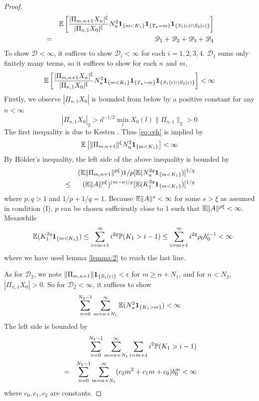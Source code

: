 \begin{proof}
\begin{eqnarray*}
    &&
    \E \left[
            {
        |\Pi_{m, n+1} X_n |^{\xi}
        \over
        |\Pi_{n, 1} X_0 |^{\xi}        
      }
      N_u^2
      \1{m < K_1} \1{T_u = m} \1{S_1(\epsilon) \cap S_2(\epsilon)} 
      \right] \nonumber \\
    &=& \mathscr D_1 + \mathscr D_2 + \mathscr D_3 + \mathscr D_4
  \end{eqnarray*}
  To show $\mathscr D < \infty$, it suffices to show
  $\mathscr D_i < \infty$ for each $i = 1, 2, 3, 4$.
  $\mathscr D_1$ sums only finitely many terms, so it
  suffices to show for each $n$ and $m$,
  \begin{equation}
    \label{eq:ceh}
    \E \left[
      {
        |\Pi_{m, n+1} X_n |^{\xi}
        \over
        |\Pi_{n, 1} X_0 |^{\xi}        
      }
      N_u^2
      \1{m < K_1} \1{T_u = m} \1{S_1(\epsilon) \cap S_2(\epsilon)} 
      \right] < \infty
  \end{equation}
  Firstly, we observe $|\Pi_{n, 1} X_0 |$ is bounded from below by a positive
  constant for any $n < \infty$
  \[
  |\Pi_{n, 1} X_0|_2 > d^{-1/2} \min_l X_0(l) \|\Pi_{n,1}\|_2 > 0
  \]
  The first inequality is due to Kesten \cite{kesten:1973}.
  Thus \eqref{eq:ceh} is implied by
  \[
    \E \left[
        \|\Pi_{m, n+1}\|^{\xi}
      N_u^2
      \1{m < K_1}
      \right] < \infty
  \]
By H\"older's inequality, the left side of the above inequality is
bounded by
\begin{eqnarray*}
  &&
  (\E \|\Pi_{m, n+1}\|^{p \xi}){1/p}
  [\E (N_u^{2q} \1{m < K_1})]^{1/q} \\
  &\leq&
  (\E \|A\|^{p \xi})^{(m-n)/p}
  [\E (K_1^{2q} \1{m < K_1})]^{1/q}
\end{eqnarray*}
where $p,q>1$ and $1/p + 1/q = 1$.
Because $\E \|A\|^{s} < \infty$ for some $s > \xi$ as assumed in
condition (I), $p$ can be chosen sufficiently close to 1 such that
$\E \|A\|^{p \xi} < \infty$. Meanwhile
\begin{eqnarray*}
  &&
  \E (K_1^{2q} \1{m < K_1}) 
  \leq
  \sum_{i=m+1}^\infty i^{2q} \P(K_1 > i - 1)
  \leq
  \sum_{i=m+1}^\infty i^{2q} \rho_0 b_0^{i-1} < \infty
\end{eqnarray*}
where we have used lemma \ref{lemma:2} to reach the
last line.

As for $\mathscr D_2$, we note
$\|\Pi_{m, n+1}\|\1{S_1(\epsilon)} < \epsilon$
for $m \geq n + N_1$, and for $n < N_2$,
$|\Pi_{n, 1} X_0| > 0$. So for $\mathscr D_2 < \infty$, it suffices to
show
\[
\sum_{n=0}^{N_2 - 1} \sum_{m=n+N_1}^\infty
\E (N_u^2 \1{K_1 > m}) < \infty
\]
The left side is bounded by
\begin{eqnarray*}
  &&
  \sum_{n=0}^{N_2 - 1} \sum_{m=n+N_1}^\infty \sum_{i=m+1}
  i^2 \P(K_1 > i - 1) \\
  &=&
  \sum_{n=0}^{N_2 - 1} \sum_{m=n+N_1}^\infty
  (c_2 m^2 + c_1 m + c_0)b_0^m < \infty
\end{eqnarray*}
where $c_0, c_1, c_2$ are constants.


\end{proof}
